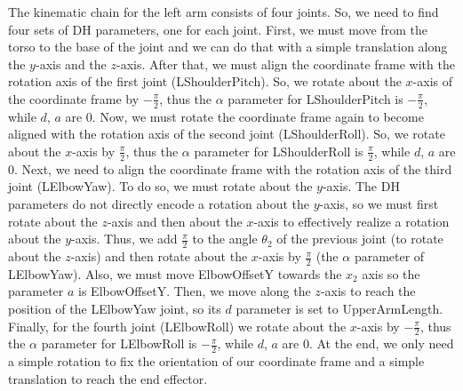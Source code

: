 The kinematic chain for the left arm consists of four joints. So, we need to find four sets of DH parameters, one for each joint. First, we must move from the torso to the base of the joint and we can do that with a simple translation along the $y$-axis and the $z$-axis. After that, we must align the coordinate frame with the rotation axis of the first joint (LShoulderPitch). So, we rotate about the $x$-axis of the coordinate frame by $-\frac{\pi}{2}$, thus the $\alpha$ parameter for LShoulderPitch is $-\frac{\pi}{2}$, while $d$, $a$ are $0$. Now, we must rotate the coordinate frame again to become aligned with the rotation axis of the second joint (LShoulderRoll). So, we rotate about the $x$-axis by $\frac{\pi}{2}$, thus the $\alpha$ parameter for LShoulderRoll is $\frac{\pi}{2}$, while $d$, $a$ are $0$. Next, we need to align the coordinate frame with the rotation axis of the third joint (LElbowYaw). To do so, we must rotate about the $y$-axis. The DH parameters do not directly encode a rotation about the $y$-axis, so we must first rotate about the $z$-axis and then about the $x$-axis to effectively realize a rotation about the $y$-axis. Thus, we add $\frac{\pi}{2}$ to the angle $\theta_2$ of the previous joint (to rotate about the $z$-axis) and then rotate about the $x$-axis by $\frac{\pi}{2}$ (the $\alpha$ parameter of LElbowYaw). Also, we must move ElbowOffsetY towards the $x_2$ axis so the parameter $a$ is ElbowOffsetY. Then, we move along the $z$-axis to reach the position of the LElbowYaw joint, so its $d$ parameter is set to UpperArmLength. Finally, for the fourth joint (LElbowRoll) we rotate about the $x$-axis by $-\frac{\pi}{2}$, thus the $\alpha$ parameter for LElbowRoll is $-\frac{\pi}{2}$, while $d$, $a$ are $0$. At the end, we only need a simple rotation to fix the orientation of our coordinate frame and a simple translation to reach the end effector.




